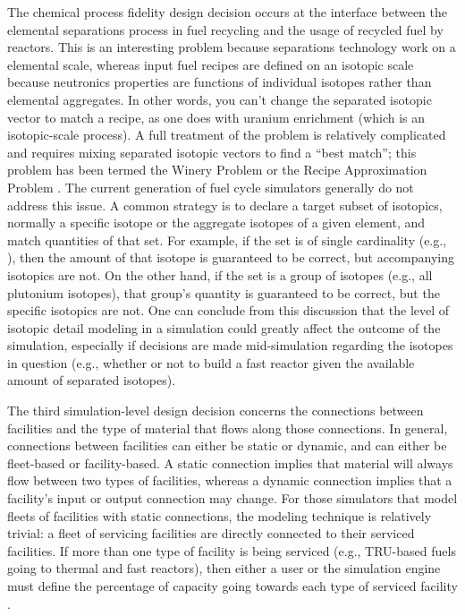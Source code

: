 The chemical process fidelity design decision occurs at the interface between
the elemental separations process in fuel recycling and the usage of recycled
fuel by reactors. This is an interesting problem because separations technology
work on a elemental scale, whereas input fuel recipes are defined on an isotopic
scale because neutronics properties are functions of individual isotopes rather
than elemental aggregates. In other words, you can't change the separated
isotopic vector to match a recipe, as one does with uranium enrichment (which is
an isotopic-scale process). A full treatment of the problem is relatively
complicated and requires mixing separated isotopic vectors to find a ``best
match''; this problem has been termed the Winery Problem or the Recipe
Approximation Problem \cite{oliver_geniusv2:_2009}. The current generation of
fuel cycle simulators generally do not address this issue. A common strategy is
to declare a target subset of isotopics, normally a specific isotope or the
aggregate isotopes of a given element, and match quantities of that set. For
example, if the set is of single cardinality (e.g., ), then the
amount of that isotope is guaranteed to be correct, but accompanying isotopics
are not. On the other hand, if the set is a group of isotopes (e.g., all
plutonium isotopes), that group's quantity is guaranteed to be correct, but the
specific isotopics are not. One can conclude from this discussion that the level
of isotopic detail modeling in a simulation could greatly affect the outcome of
the simulation, especially if decisions are made mid-simulation regarding the
isotopes in question (e.g., whether or not to build a fast reactor given the
available amount of separated isotopes). 

The third simulation-level design decision concerns the connections between
facilities and the type of material that flows along those connections. In
general, connections between facilities can either be static or dynamic, and can
either be fleet-based or facility-based. A static connection implies that
material will always flow between two types of facilities, whereas a dynamic
connection implies that a facility's input or output connection may change.  For
those simulators that model fleets of facilities with static connections, the
modeling technique is relatively trivial: a fleet of servicing facilities are
directly connected to their serviced facilities. If more than one type of
facility is being serviced (e.g., TRU-based fuels going to thermal and fast
reactors), then either a user or the simulation engine must define the
percentage of capacity going towards each type of serviced facility
\cite{busquim_e_silva_system_2008}.

